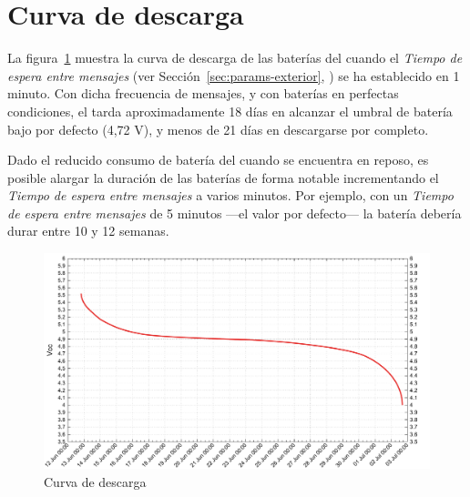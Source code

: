\section{Curva de descarga}
\label{app:curva-descarga}

La figura~\ref{fig:discharge-curve} muestra la curva de descarga de las baterías del \MEE cuando el \emph{Tiempo de espera entre mensajes} (ver Sección~\ref{sec:params-exterior}, \textit{}) se ha establecido en 1 minuto.
Con dicha frecuencia de mensajes, y con baterías en perfectas condiciones, el \ME tarda aproximadamente 18 días en alcanzar el umbral de batería bajo por defecto (4,72 V), y menos de 21 días en descargarse por completo. 

Dado el reducido consumo de batería del \MEE cuando se encuentra en reposo, es posible alargar la duración de las baterías de forma notable incrementando el \emph{Tiempo de espera entre mensajes} a varios minutos. Por ejemplo, con un \emph{Tiempo de espera entre mensajes} de 5 minutos ---el valor por defecto--- la batería debería durar entre 10 y 12 semanas.

\begin{figure}[H]
  \centering
  \includegraphics[width=1\columnwidth]{images/discharge-curve}
  \caption{Curva de descarga}
  \label{fig:discharge-curve}
\end{figure}

